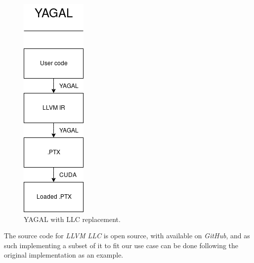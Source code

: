 \begin{figure}[!htb]
\begin{minipage}{0.4\textwidth}
        \includegraphics[width=0.5\linewidth]{chapters/implementation/figs/YAGALLLC.png}
        \caption{YAGAL with LLC replacement.}
        \label{fig:noLLC}
    \end{minipage}
\end{figure}

The source code for \textit{LLVM LLC} is open source, with available on \textit{GitHub}\cite{llvmGithub}, and as such implementing a subset of it to fit our use case can be done following the original implementation as an example.

